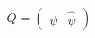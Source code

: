 \begin{equation}
Q = \left( \begin{array}{cc}
\psi & \hat{\psi}
\end{array}  \right)
\end{equation}

